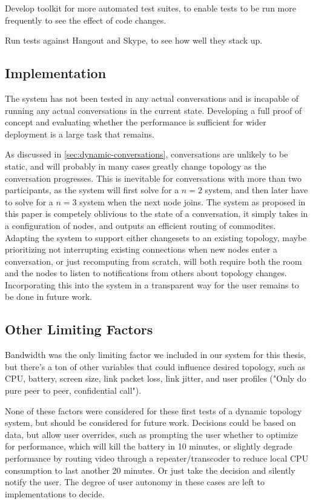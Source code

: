 Develop toolkit for more automated test suites, to enable tests to be run more frequently to see the effect of code changes.

Run tests against Hangout and Skype, to see how well they stack up.

\subsection{Implementation}

The system has not been tested in any actual conversations and is incapable of running any actual conversations in the current state. Developing a full proof of concept and evaluating whether the performance is sufficient for wider deployment is a large task that remains.

As discussed in \autoref{sec:dynamic-conversations}, conversations are unlikely to be static, and will probably in many cases greatly change topology as the conversation progresses. This is inevitable for conversations with more than two participants, as the system will first solve for a $n=2$ system, and then later have to solve for a $n=3$ system when the next node joins. The system as proposed in this paper is competely oblivious to the state of a conversation, it simply takes in a configuration of nodes, and outputs an efficient routing of commodites. Adapting the system to support either changesets to an existing topology, maybe prioritizing not interrupting existing connections when new nodes enter a conversation, or just recomputing from scratch, will both require both the room and the nodes to listen to notifications from others about topology changes. Incorporating this into the system in a transparent way for the user remains to be done in future work.


\subsection{Other Limiting Factors}

Bandwidth was the only limiting factor we included in our system for this thesis, but there's a ton of other variables that could influence desired topology, such as CPU, battery, screen size, link packet loss, link jitter, and user profiles ("Only do pure peer to peer, confidential call").

None of these factors were considered for these first tests of a dynamic topology system, but should be considered for future work. Decisions could be based on data, but allow user overrides, such as prompting the user whether to optimize for performance, which will kill the battery in 10 minutes, or slightly degrade performance by routing video through a repeater/transcoder to reduce local CPU consumption to last another 20 minutes. Or just take the decision and silently notify the user. The degree of user autonomy in these cases are left to implementations to decide.
